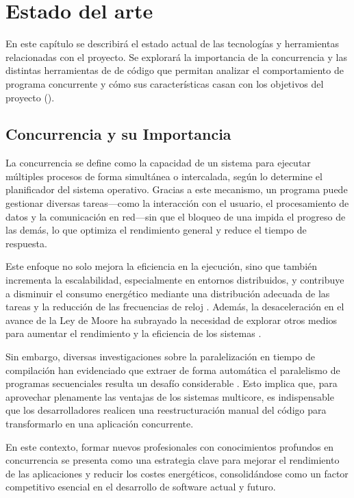 \chapter{Estado del arte}\label{chap:estado-del-arte}
En este capítulo se describirá el estado actual de las tecnologías y herramientas relacionadas con el proyecto. Se explorará la importancia de la concurrencia y las distintas herramientas de  de código que permitan analizar el comportamiento de \gls{programa concurrente} y cómo sus características casan con los objetivos del proyecto ().

\section{Concurrencia y su Importancia}\label{sec:concurrencia-importancia}

La concurrencia se define como la capacidad de un sistema para ejecutar múltiples procesos de forma simultánea o intercalada, según lo determine el \gls{planificador} del sistema operativo. Gracias a este mecanismo, un programa puede gestionar diversas tareas—como la interacción con el usuario, el procesamiento de datos y la comunicación en red—sin que el bloqueo de una impida el progreso de las demás, lo que optimiza el rendimiento general y reduce el tiempo de respuesta.

Este enfoque no solo mejora la eficiencia en la ejecución, sino que también incrementa la escalabilidad, especialmente en entornos distribuidos, y contribuye a disminuir el consumo energético mediante una distribución adecuada de las tareas y la reducción de las frecuencias de reloj \cite{EnergyEfficiencyParallelAplications}. Además, la desaceleración en el avance de la \gls{Ley de Moore} ha subrayado la necesidad de explorar otros medios para aumentar el rendimiento y la eficiencia de los sistemas \cite{ParallelProgramming}.

Sin embargo, diversas investigaciones sobre la paralelización en tiempo de compilación han evidenciado que extraer de forma automática el paralelismo de programas secuenciales resulta un desafío considerable \cite{ParallelProgramming}. Esto implica que, para aprovechar plenamente las ventajas de los sistemas multicore, es indispensable que los desarrolladores realicen una reestructuración manual del código para transformarlo en una aplicación concurrente.

En este contexto, formar nuevos profesionales con conocimientos profundos en concurrencia se presenta como una estrategia clave para mejorar el rendimiento de las aplicaciones y reducir los costes energéticos, consolidándose como un factor competitivo esencial en el desarrollo de software actual y futuro.


